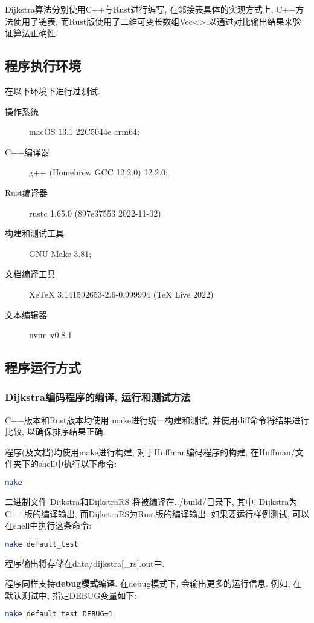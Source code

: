 Dijkstra算法分别使用C++与Rust进行编写, 在邻接表具体的实现方式上,
C++方法使用了链表,
而Rust版使用了二维可变长数组Vec<>.以通过对比输出结果来验证算法正确性.

\subsection{程序执行环境}
在以下环境下进行过测试.

\begin{description}
	\item[操作系统] macOS 13.1 22C5044e arm64;
	\item[C++编译器] g++ (Homebrew GCC 12.2.0) 12.2.0;
	\item[Rust编译器] rustc 1.65.0 (897e37553 2022-11-02)
	\item[构建和测试工具] GNU Make 3.81;
	\item[文档编译工具] XeTeX 3.141592653-2.6-0.999994 (TeX Live 2022)
	\item[文本编辑器] nvim v0.8.1
\end{description}

\subsection{程序运行方式}
\subsubsection{Dijkstra编码程序的编译, 运行和测试方法}
C++版本和Rust版本均使用 make进行统一构建和测试, 并使用diff命令将结果进行比较,
以确保排序结果正确.\par

程序(及文档)均使用make进行构建, 对于Huffman编码程序的构建, 在Huffman/文件夹下的shell中执行以下命令:
\begin{lstlisting}[language=bash]
make
\end{lstlisting}
二进制文件 Dijkstra和DijkstraRS 将被编译在../build/目录下, 其中,
Dijkstra为C++版的编译输出, 而DijkstraRS为Rust版的编译输出.
如果要运行样例测试, 可以在shell中执行这条命令:

\begin{lstlisting}[language=bash]
make default_test
\end{lstlisting}
程序输出将存储在data/dijkstra[\_rs].out中.\par

程序同样支持\textbf{debug模式}编译. 在debug模式下, 会输出更多的运行信息.
例如, 在默认测试中, 指定DEBUG变量如下:
\begin{lstlisting}[language=bash]
make default_test DEBUG=1
\end{lstlisting}

